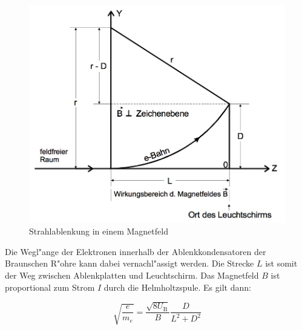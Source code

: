 		\begin{figure}[h]
			\centering
			\includegraphics[width = 12cm]{img/magnetfeld.jpg}
			\caption{Strahlablenkung in einem Magnetfeld}
			\label{magnetfeld}
		\end{figure}

		Die Wegl"ange der Elektronen innerhalb der Ablenkkondensatoren der Braunschen R"ohre kann dabei vernachl"assigt werden.
		Die Strecke $L$ ist somit der Weg zwischen Ab\-lenk\-plat\-ten und Leuchtschirm.
		Das Magnetfeld $B$ ist proportional zum Strom $I$ durch die Helm\-holtz\-spu\-le.
		Es gilt dann:

		\begin{equation}
			\sqrt{\frac{e}{m_e}} = \frac{\sqrt{8 U_\mathrm{B}}}{B} \frac{D}{L^2 + D^2}
		\end{equation}
